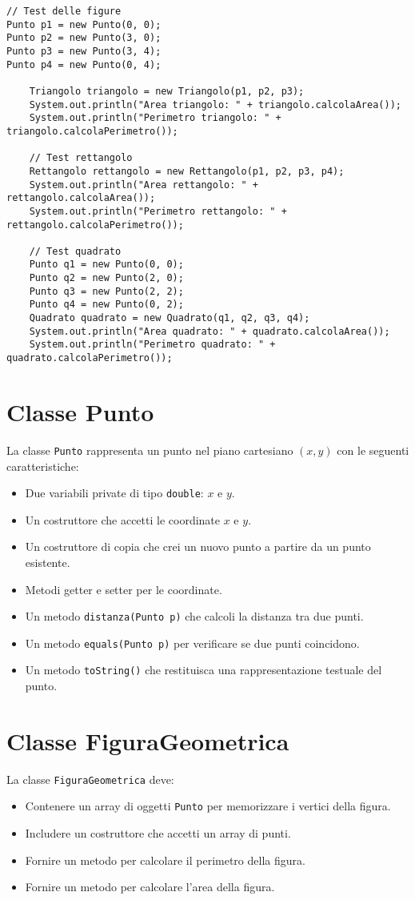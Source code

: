 \documentclass{article}
\begin{document}
\begin{verbatim}
// Test delle figure
Punto p1 = new Punto(0, 0);
Punto p2 = new Punto(3, 0);
Punto p3 = new Punto(3, 4);
Punto p4 = new Punto(0, 4);

    Triangolo triangolo = new Triangolo(p1, p2, p3);
    System.out.println("Area triangolo: " + triangolo.calcolaArea());
    System.out.println("Perimetro triangolo: " + triangolo.calcolaPerimetro());

    // Test rettangolo
    Rettangolo rettangolo = new Rettangolo(p1, p2, p3, p4);
    System.out.println("Area rettangolo: " + rettangolo.calcolaArea());
    System.out.println("Perimetro rettangolo: " + rettangolo.calcolaPerimetro());

    // Test quadrato
    Punto q1 = new Punto(0, 0);
    Punto q2 = new Punto(2, 0);
    Punto q3 = new Punto(2, 2);
    Punto q4 = new Punto(0, 2);
    Quadrato quadrato = new Quadrato(q1, q2, q3, q4);
    System.out.println("Area quadrato: " + quadrato.calcolaArea());
    System.out.println("Perimetro quadrato: " + quadrato.calcolaPerimetro());
\end{verbatim}


\section{Classe Punto}
La classe \texttt{Punto} rappresenta un punto nel piano cartesiano $(x, y)$ con le seguenti caratteristiche:
\begin{itemize}
\item Due variabili private di tipo \texttt{double}: $x$ e $y$.
\item Un costruttore che accetti le coordinate $x$ e $y$.
\item Un costruttore di copia che crei un nuovo punto a partire da un punto esistente.
\item Metodi getter e setter per le coordinate.
\item Un metodo \texttt{distanza(Punto p)} che calcoli la distanza tra due punti.
\item Un metodo \texttt{equals(Punto p)} per verificare se due punti coincidono.
\item Un metodo \texttt{toString()} che restituisca una rappresentazione testuale del punto.
\end{itemize}








\section{Classe FiguraGeometrica}
La classe \texttt{FiguraGeometrica} deve:
\begin{itemize}
\item Contenere un array di oggetti \texttt{Punto} per memorizzare i vertici della figura.
\item Includere un costruttore che accetti un array di punti.
\item Fornire un metodo per calcolare il perimetro della figura.
\item Fornire un metodo per calcolare l'area della figura.
\end{itemize}
\end{document}
